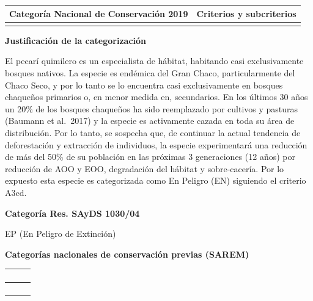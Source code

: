 \documentclass[
  x11names]{article}
\begin{document}
\vspace{-0.4cm}

\begin{tabu} to 
\toprule
\textbf{Categoría Nacional de Conservación 2019} & \textbf{Criterios y subcriterios}\\
\midrule
{} & \\
\bottomrule
\end{tabu}

\textbf{Justificación de la categorización}

El pecarí quimilero es un especialista de hábitat, habitando casi
exclusivamente bosques nativos. La especie es endémica del Gran Chaco,
particularmente del Chaco Seco, y por lo tanto se lo encuentra casi
exclusivamente en bosques chaqueños primarios o, en menor medida en,
secundarios. En los últimos 30 años un 20\% de los bosques chaqueños ha
sido reemplazado por cultivos y pasturas (Baumann et al.~2017) y la
especie es activamente cazada en toda su área de distribución. Por lo
tanto, se sospecha que, de continuar la actual tendencia de
deforestación y extracción de individuos, la especie experimentará una
reducción de más del 50\% de su población en las próximas 3 generaciones
(12 años) por reducción de AOO y EOO, degradación del hábitat y
sobre-cacería. Por lo expuesto esta especie es categorizada como En
Peligro (EN) siguiendo el criterio A3cd.

\textbf{Categoría Res. SAyDS 1030/04}

EP (En Peligro de Extinción)

\textbf{Categorías nacionales de conservación previas (SAREM)}

\begin{tabu} to 
\toprule
\textbf{} &  & \\
\bottomrule
\end{tabu}

\begin{tabu} to 
\toprule
\textbf{} &  & \\
\bottomrule
\end{tabu}

\begin{tabu} to 
\toprule
\textbf{} &  & \\
\bottomrule
\end{tabu}
\end{document}
